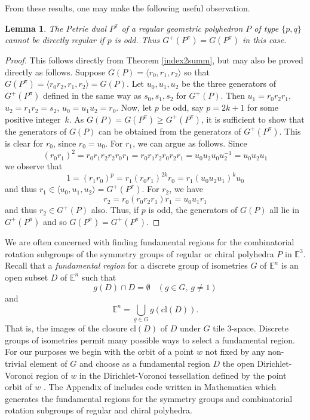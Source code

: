 \documentclass[12pt]{article}
\newtheorem{lemma}[theorem]{Lemma}
\theoremstyle{definition}\newtheorem{definition}{Definition}[section]
\begin{document}
From these results, one may make the following useful observation. 
\smallskip

\begin{lemma}
The Petrie dual $P^\pi$ of a regular geometric polyhedron $P$ of type $\{p,q\}$ cannot be directly regular if $p$ is odd. Thus $G^{+}(P^\pi)=G(P^\pi)$ in this case.
\end{lemma}

\begin{proof}
This follows directly from Theorem \ref{index2summ}, but may also be proved directly as follows. Suppose $G(P)=\langle r_0,r_1,r_2\rangle$ so that $G(P^{\pi})=\langle r_0r_2,r_1,r_2\rangle=G(P)$. Let $u_0, u_1, u_2$ be the three generators of $G^+(P^\pi)$ defined in the same way as $s_0, s_1, s_2$ for $G^+(P)$. Then $u_1 = r_0r_2r_1$, $u_2 =r_1r_2 = s_2$, $u_0 = u_1u_2 = r_0$. Now, let $p$ be odd, say $p = 2k+1$ for some positive integer~$k$. As $G(P) = G(P^\pi) \geq G^+(P^\pi)$, it is sufficient to show that the generators of $G(P)$ can be obtained from the generators of $G^+(P^\pi)$. This is clear for $r_0$, since $r_0 = u_0$. For $r_1$, we can argue as follows. Since 
$$(r_0r_1)^2 = r_0r_1r_2r_2r_0r_1 = r_0r_1r_2r_0r_2r_1 = u_0u_2u_0u_2^{-1} = u_0u_2u_1$$ 
we observe that 
$$ 1 = (r_1r_0)^p = r_1(r_0r_1)^{2k}r_0 = r_1(u_0u_2u_1)^k u_0$$ 
and thus $r_1 \in \langle  u_0,u_1,u_2 \rangle = G^+(P^\pi)$. 
For $r_2$, we have 
$$r_2 = r_0(r_0r_2r_1)r_1 = u_0u_1r_1$$ 
and thus $r_2 \in G^+(P)$ also. Thus, if $p$ is odd, the generators of $G(P)$ all lie in $G^+(P^\pi)$ and so $G(P^\pi) = G^+(P^\pi)$.
\end{proof}
\smallskip

We are often concerned with finding fundamental regions for the combinatorial rotation subgroups of the symmetry groups of regular or chiral polyhedra $P$ in $\mathbb{E}^3$. Recall that a \textit{fundamental region} for a discrete group of isometries $G$ of $\mathbb{E}^n$ is an open subset $D$ of $\mathbb{E}^n$ such that
\[g(D) \cap D = \emptyset\;\;\; (g\in G,\, g\neq 1)\]
and 
\[\mathbb{E}^n = \bigcup_{g\in G} g(\text{cl}(D)).\]
That is, the images of the closure cl$(D)$ of $D$ under $G$ tile 3-space. Discrete groups of isometries permit many possible ways to select a fundamental region. For our purposes we begin with the orbit of a point $w$ not fixed by any non-trivial element of $G$ and choose as a fundamental region $D$ the open Dirichlet-Voronoi region of $w$ in the Dirichlet-Voronoi tessellation defined by the point orbit of $w$ \cite{Wythoffians}. The Appendix of \cite{Sk1} includes code written in Mathematica \cite{Mathematica} which generates the fundamental regions for the symmetry groups and combinatorial rotation subgroups of regular and chiral polyhedra.
\smallskip
\end{document}
